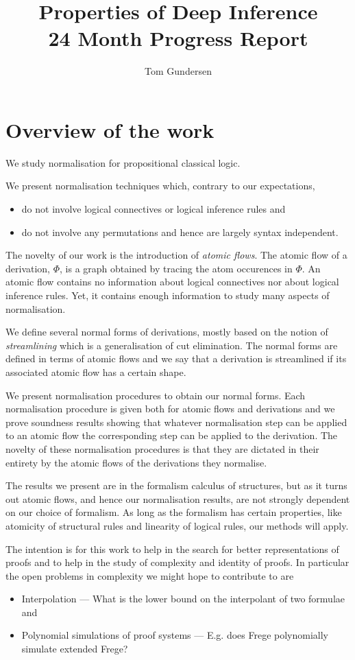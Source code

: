 \documentclass[]{article}
\title{Properties of Deep Inference \\ 24 Month Progress Report}
\author{Tom Gundersen}
\begin{document}
\maketitle

\section{Overview of the work}

We study normalisation for propositional classical logic.

We present normalisation techniques which, contrary to our expectations,
\begin{itemize}
\item do not involve logical connectives or logical inference rules and
\item do not involve any permutations and hence are largely syntax independent.
\end{itemize}

The novelty of our work is the introduction of \emph{atomic flows}. The atomic flow of a derivation, $\Phi$, is a graph obtained by tracing the atom occurences in $\Phi$. An atomic flow contains no information about logical connectives nor about logical inference rules. Yet, it contains enough information to study many aspects of normalisation.

We define several normal forms of derivations, mostly based on the notion of \emph{streamlining} which is a generalisation of cut elimination. The normal forms are defined in terms of atomic flows and we say that a derivation is streamlined if its associated atomic flow has a certain shape.

We present normalisation procedures to obtain our normal forms. Each normalisation procedure is given both for atomic flows and derivations and we prove soundness results showing that whatever normalisation step can be applied to an atomic flow the corresponding step can be applied to the derivation. The novelty of these normalisation procedures is that they are dictated in their entirety by the atomic flows of the derivations they normalise.

The results we present are in the formalism calculus of structures, but as it turns out atomic flows, and hence our normalisation results, are not strongly dependent on our choice of formalism. As long as the formalism has certain properties, like atomicity of structural rules and linearity of logical rules, our methods will apply.

The intention is for this work to help in the search for better representations of proofs and to help in the study of complexity and identity of proofs. In particular the open problems in complexity we might hope to contribute to are
\begin{itemize}
 \item Interpolation --- What is the lower bound on the interpolant of two formulae and
 \item Polynomial simulations of proof systems --- E.g. does Frege polynomially simulate extended Frege?
\end{itemize}
\end{document}
